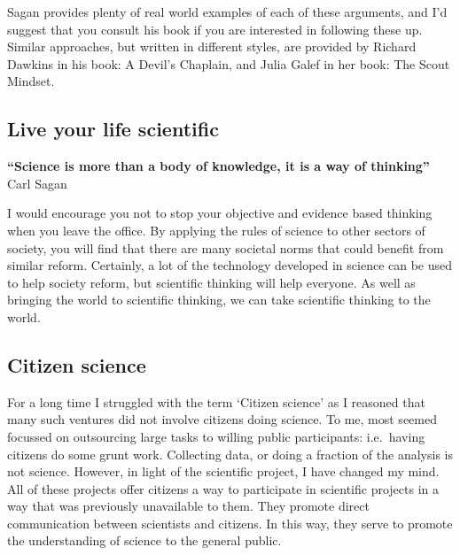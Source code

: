 \documentclass[
]{krantz}
\renewenvironment{quote}{\begin{VF}}{\end{VF}}
\begin{document}
Sagan provides plenty of real world examples of each of these arguments, and I'd suggest that you consult his book \citep{sagan2011demon} if you are interested in following these up. Similar approaches, but written in different styles, are provided by Richard Dawkins in his \citeyearpar{dawkins2004devil} book: A Devil's Chaplain, and Julia Galef in her \citeyearpar{galef2021scout} book: The Scout Mindset.

\hypertarget{live-your-life-scientific}{%
\subsection{Live your life scientific}\label{live-your-life-scientific}}

\begin{quote}
\textbf{``Science is more than a body of knowledge, it is a way of thinking''}
Carl Sagan \citeyearpar{sagan2011demon}
\end{quote}

I would encourage you not to stop your objective and evidence based thinking when you leave the office. By applying the rules of science to other sectors of society, you will find that there are many societal norms that could benefit from similar reform. Certainly, a lot of the technology developed in science can be used to help society reform, but scientific thinking will help everyone. As well as bringing the world to scientific thinking, we can take scientific thinking to the world.

\hypertarget{citizen-science}{%
\subsection{Citizen science}\label{citizen-science}}

For a long time I struggled with the term `Citizen science' as I reasoned that many such ventures did not involve citizens doing science. To me, most seemed focussed on outsourcing large tasks to willing public participants: i.e.~having citizens do some grunt work. Collecting data, or doing a fraction of the analysis is not science. However, in light of the scientific project, I have changed my mind. All of these projects offer citizens a way to participate in scientific projects in a way that was previously unavailable to them. They promote direct communication between scientists and citizens. In this way, they serve to promote the understanding of science to the general public.
\end{document}
